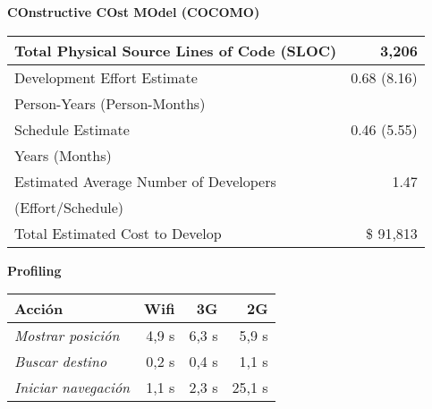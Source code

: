 \begin{slide}
  \begin{block}{\textbf{COnstructive COst MOdel (COCOMO)}}
\begin{table}[h]
  \centering
  \begin{tabular}{|l|r|}
    \hline
    Total Physical Source Lines of Code (SLOC) & 3,206 \\
    \hline
    Development Effort Estimate & 0.68 (8.16) \\
    Person-Years (Person-Months) & \\
    \hline
    Schedule Estimate & 0.46 (5.55) \\
    Years (Months) & \\
    \hline
    Estimated Average Number of Developers & 1.47 \\
    (Effort/Schedule) & \\
    \hline
    Total Estimated Cost to Develop & \$ 91,813 \\
    \hline
  \end{tabular}
\end{table}
  \end{block}
\end{slide}

\begin{slide}
  \begin{block}{\textbf{Profiling}}
\begin{table}[h]
  \centering
  \begin{tabular}{|l|r|r|r|}
    \hline
    \textbf{Acción} & \textbf{Wifi} & \textbf{3G} & \textbf{2G} \\
    \hline
    \emph{Mostrar posición}   & 4,9 s & 6,3 s & 5,9 s \\
    \hline
    \emph{Buscar destino}     & 0,2 s & 0,4 s & 1,1 s \\
    \hline
    \emph{Iniciar navegación} & 1,1 s & 2,3 s & 25,1 s \\
    \hline
  \end{tabular}
\end{table}
  \end{block}
\end{slide}

